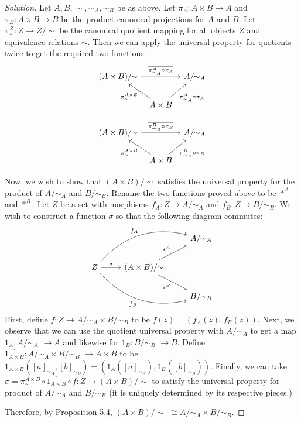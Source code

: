 \documentclass[fontsize=14pt]{scrartcl}
\theoremstyle{definition}
\newenvironment{solution}{
  \begin{proof}[Solution]
  \vspace{-8px}
  \setlength{\parskip}{4px}
  \setlength{\parindent}{0px}
}{
  \end{proof}
}
\newcommand{\quotuniv}[1]{\overline{#1}}
\begin{document}
\begin{solution}
\newcommand{\quot}[2]{#1/\!\!#2\,\,}
\newcommand{\quotntws}[2]{#1/\!\!#2}
Let $A,B,\sim,\sim_A,\sim_B$ be as above. Let $\pi_A:A\times B\to A$ and
$\pi_B:A\times B\to B$ be the product canonical projections for $A$ and $B$. Let
$\pi^Z_\sim:Z\to\quotntws{Z}{\sim}$ be the canonical quotient mapping for all
objects $Z$ and equivalence relations $\sim$. Then we can apply the universal
property for quotients twice to get the required two functions:
\[\begin{tikzcd}[column sep=tiny]
\quotntws{(A\times B)}{\sim} \arrow[rr,"\quotuniv{\pi^A_{\sim_A}\circ\pi_A}"] && \quotntws{A}{\sim_A} \\
&A\times B \arrow[ul,"\pi^{A\times B}_\sim"] \arrow[ur,swap, "\pi^A_{\sim_A}\circ\pi_A"]&
\end{tikzcd}\]

\[\begin{tikzcd}[column sep=tiny]
\quotntws{(A\times B)}{\sim} \arrow[rr,"\quotuniv{\pi^B_{\sim_B}\circ\pi_B}"] && \quotntws{A}{\sim_A} \\
&A\times B \arrow[ul,"\pi^{A\times B}_\sim"] \arrow[ur,swap, "\pi^B_{\sim_B}\circ\pi_B"]&
\end{tikzcd}\]

\def \quotA {\quotntws{A}{\sim_A}}
\def \quotB {\quotntws{B}{\sim_B}}

Now, we wish to show that $\quotntws{(A\times B)}{\sim}$ satisfies the universal
property for the product of $\quotA$ and $\quotB$. Rename the two functions
proved above to be $*^A$ and $*^B$. Let $Z$ be a set with morphisms
$f_A:Z\to\quotA$ and $f_B:Z\to\quotB$. We wish to construct a function $\sigma$
so that the following diagram commutes:
%
\[\begin{tikzcd}
&& \quotntws{A}{\sim_A} \\
Z\arrow[r,"\sigma"]\arrow[urr,bend left,"f_A"]\arrow[drr,bend right,swap,"f_B"]
   &\quotntws{(A\times B)}{\sim}\arrow[ur,"*^A"]\arrow[dr,swap,"*^B"] \\
&& \quotntws{B}{\sim_B}
\end{tikzcd}\]
%
\def \quotAB {\quotA\times\quotB}
First, define $f:Z\to\quotAB$ to be $f(z)=(f_A(z),f_B(z))$. Next, we observe
that we can use the quotient universal property with $\quotA$ to get a map
$\quotuniv{1_A}:\quotA\,\,\to A$ and likewise for $\quotuniv{1_B}:\quotB\,\,\to
B$. Define $\quotuniv{1_{A\times B}}:\quotAB\,\,\to A\times B$ to be
$\quotuniv{1_{A\times B}}([a]_{\sim_A},[b]_{\sim_B}) =
(\quotuniv{1_A}([a]_{\sim_A}), \quotuniv{1_B}([b]_{\sim_B}))$. Finally, we can
take $\sigma=\pi^{A\times B}_\sim \circ \quotuniv{1_{A\times B}} \circ
f:Z\to\quotntws{(A\times B)}{\sim}$ to satisfy the universal property for
product of $\quotA$ and $\quotB$ (it is uniquely determined by its respective
pieces.)

Therefore, by Proposition 5.4, $\quot{(A\times B)}{\sim}\cong\quotA \times
\quotB$.
\end{solution}
\end{document}

